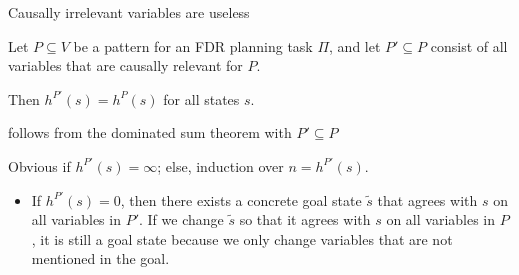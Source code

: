 \documentclass{gkibeamer}
\begin{document}
\begin{frame}{Causally irrelevant variables are useless}
  \begin{theorem}
    Let $P \subseteq V$ be a pattern for an FDR planning task $\Pi$,
    and let $P' \subseteq P$ consist of all variables that are
    causally relevant for $P$.

    Then $h^{P'}(s) = h^P(s)$ for all states $s$.
  \end{theorem}

  \pause

  \begin{proofstart}
    \hilite{$(\le)$:} follows from the dominated sum theorem with $P'
    \subseteq P$

  \pause
    \medskip

    \hilite{$(\ge)$:} Obvious if $h^{P'}(s) = \infty$; else, induction
    over $n = h^{P'}(s)$.

    \begin{itemize}
    \item {}

      If $h^{P'}(s) = 0$, then there exists a concrete goal state
      $\tilde{s}$ that agrees with $s$ on all variables in $P'$. If we
      change $\tilde{s}$ so that it agrees with $s$ on all variables in
      $P$, it is still a goal state because we only change variables
      that are not mentioned in the goal.
    \end{itemize}
  \end{proofstart}
\end{frame}
\end{document}

